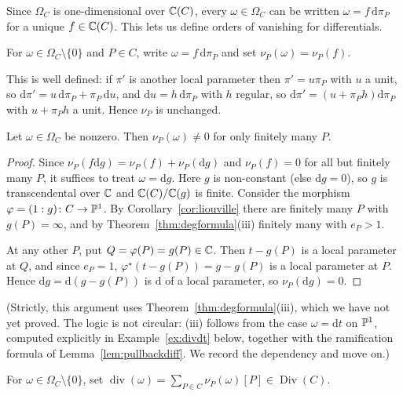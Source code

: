 \documentclass[a4paper]{scrartcl}
\newcommand{\dee}{\mathrm{d}}
\DeclareMathOperator{\Div}{Div}
\DeclareMathOperator{\Divv}{div}
\begin{document}
Since $\Omega_C$ is one-dimensional over $\mathbb{C}(C)$, every $\omega \in \Omega_C$ can be written $\omega = f\,\dee\pi_P$ for a unique $f \in \mathbb{C}(C)$. This lets us define orders of vanishing for differentials.

\begin{definition}
	For $\omega \in \Omega_C\setminus\{0\}$ and $P \in C$, write $\omega = f\,\dee\pi_P$ and set $\nu_P(\omega) = \nu_P(f)$.
\end{definition}

This is well defined: if $\pi'$ is another local parameter then $\pi' = u\pi_P$ with $u$ a unit, so $\dee\pi' = u\,\dee\pi_P + \pi_P\,\dee u$, and $\dee u = h\,\dee\pi_P$ with $h$ regular, so $\dee\pi' = (u + \pi_Ph)\dee\pi_P$ with $u + \pi_Ph$ a unit. Hence $\nu_P$ is unchanged.

\begin{lemma}\label{lem:omegafinite}
	Let $\omega \in \Omega_C$ be nonzero. Then $\nu_P(\omega)\neq 0$ for only finitely many $P$.
\end{lemma}

\begin{proof}
	Since $\nu_P(f\dee g) = \nu_P(f) + \nu_P(\dee g)$ and $\nu_P(f) = 0$ for all but finitely many $P$, it suffices to treat $\omega = \dee g$. Here $g$ is non-constant (else $\dee g = 0$), so $g$ is transcendental over $\mathbb{C}$ and $\mathbb{C}(C)/\mathbb{C}(g)$ is finite. Consider the morphism $\varphi = (1:g)\colon C \to \mathbb{P}^1$. By Corollary~\ref{cor:liouville} there are finitely many $P$ with $g(P) = \infty$, and by Theorem~\ref{thm:degformula}(iii) finitely many with $e_P > 1$.

	At any other $P$, put $Q = \varphi(P) = g(P) \in \mathbb{C}$. Then $t - g(P)$ is a local parameter at $Q$, and since $e_P = 1$, $\varphi^\star(t - g(P)) = g - g(P)$ is a local parameter at $P$. Hence $\dee g = \dee(g - g(P))$ is $\dee$ of a local parameter, so $\nu_P(\dee g) = 0$.
\end{proof}

(Strictly, this argument uses Theorem~\ref{thm:degformula}(iii), which we have not yet proved. The logic is not circular: (iii) follows from the case $\omega = \dee t$ on $\mathbb{P}^1$, computed explicitly in Example~\ref{ex:divdt} below, together with the ramification formula of Lemma~\ref{lem:pullbackdiff}. We record the dependency and move on.)

\begin{definition}
	For $\omega \in \Omega_C\setminus\{0\}$, set $\Divv(\omega) = \sum_{P\in C}\nu_P(\omega)[P] \in \Div(C)$.
\end{definition}
\end{document}
